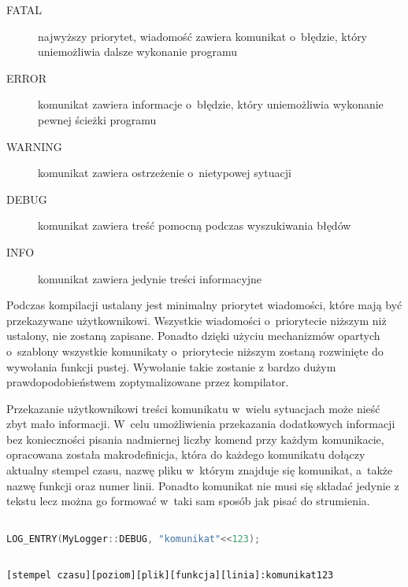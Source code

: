\begin{description}
\item[FATAL] najwyższy priorytet, wiadomość zawiera komunikat
  o~błędzie, który uniemożliwia dalsze wykonanie programu
\item[ERROR] komunikat zawiera informacje o~błędzie, który
  uniemożliwia wykonanie pewnej ścieżki programu
\item[WARNING] komunikat zawiera ostrzeżenie o~nietypowej sytuacji
\item[DEBUG] komunikat zawiera treść pomocną podczas wyszukiwania błędów
\item[INFO] komunikat zawiera jedynie treści informacyjne
\end{description}

Podczas kompilacji ustalany jest minimalny priorytet wiadomości, które
mają być przekazywane użytkownikowi. Wszystkie wiadomości
o~priorytecie niższym niż ustalony, nie zostaną zapisane. Ponadto
dzięki użyciu mechanizmów opartych o~szablony wszystkie komunikaty
o~priorytecie niższym zostaną rozwinięte do wywołania funkcji
pustej. Wywołanie takie zostanie z bardzo dużym prawdopodobieństwem
zoptymalizowane przez kompilator.

Przekazanie użytkownikowi treści komunikatu w~wielu sytuacjach może
nieść zbyt mało informacji. W~celu umożliwienia przekazania
dodatkowych informacji bez konieczności pisania nadmiernej liczby
komend przy każdym komunikacie, opracowana została makrodefinicja,
która do każdego komunikatu dołączy aktualny stempel czasu, nazwę
pliku w~którym znajduje się komunikat, a~także nazwę funkcji oraz
numer linii. Ponadto komunikat nie musi się składać jedynie z tekstu
lecz można go formować w~taki sam sposób jak pisać do strumienia.

\vspace{0.5cm}
\begin{minipage}{\textwidth}
\begin{lstlisting}[language=c++ , caption=Przykładowe wypisanie komunikatu]

LOG_ENTRY(MyLogger::DEBUG, "komunikat"<<123);

\end{lstlisting}
\end{minipage}
\vspace{0.5cm}

\vspace{0.5cm}
\begin{minipage}{\textwidth}
\begin{lstlisting}[caption=Format komunikatu przekazywanego użytkownikowi]

[stempel czasu][poziom][plik][funkcja][linia]:komunikat123

\end{lstlisting}
\end{minipage}
\vspace{0.5cm}

